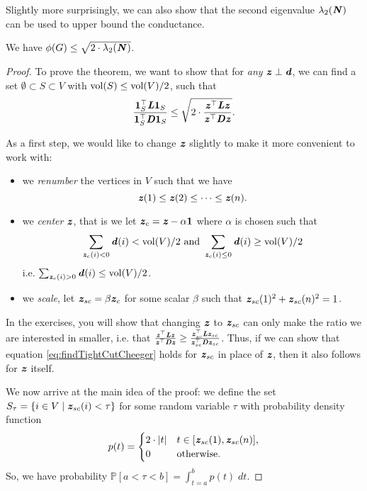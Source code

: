 Slightly more surprisingly, we can also show that the second eigenvalue $\lambda_2(\boldsymbol{\mathit{N}})$ can be used to upper bound the conductance.

\begin{theorem}\label{thm:cheegerInequUpperBound}
We have $\phi(G) \leq \sqrt{2 \cdot \lambda_2(\boldsymbol{\mathit{N}})}$.
\end{theorem}
\begin{proof}
To prove the theorem, we want to show that for \emph{any} $\boldsymbol{\mathit{z}} \perp
\boldsymbol{\mathit{d}}$, we can find a set $\emptyset \subset S \subset V$ with $\operatorname{vol}(S)
\leq \operatorname{vol}(V)/2$, such that 
\begin{equation}\label{eq:findTightCutCheeger}
\frac{\boldsymbol{1}_S^\top \boldsymbol{\mathit{L}} \boldsymbol{1}_S}{\boldsymbol{1}_S^\top \boldsymbol{\mathit{D}} \boldsymbol{1}_S}  \leq \sqrt{2 \cdot \frac{\boldsymbol{\mathit{z}}^\top \boldsymbol{\mathit{L}} \boldsymbol{\mathit{z}}}{\boldsymbol{\mathit{z}}^\top \boldsymbol{\mathit{D}} \boldsymbol{\mathit{z}}}}.    
\end{equation}

As a first step, we would like to change $\boldsymbol{\mathit{z}}$ slightly to make it more convenient to work with:
\begin{itemize}
    \item we \emph{renumber} the vertices in $V$ such that we have
    \[
    \boldsymbol{\mathit{z}}(1) \leq \boldsymbol{\mathit{z}}(2) \leq \dots \leq \boldsymbol{\mathit{z}}(n).
    \]
    \item we \emph{center} $\boldsymbol{\mathit{z}}$, that is we let $\boldsymbol{\mathit{z}}_c = \boldsymbol{\mathit{z}} - \alpha \boldsymbol{1}$ where $\alpha$ is chosen such that \begin{align*}
        \sum_{\boldsymbol{\mathit{z}}_c(i) < 0} \boldsymbol{\mathit{d}}(i) < \operatorname{vol}(V)/2 \text{ and }
        \sum_{\boldsymbol{\mathit{z}}_c(i) \leq 0} \boldsymbol{\mathit{d}}(i) \geq \operatorname{vol}(V)/2
    \end{align*}
    i.e. $\sum_{\boldsymbol{\mathit{z}}_c(i) > 0} \boldsymbol{\mathit{d}}(i) \leq \operatorname{vol}(V)/2$.
    \item we \emph{scale}, let $\boldsymbol{\mathit{z}}_{sc} = \beta \boldsymbol{\mathit{z}}_c$ for some scalar $\beta$ such that $\boldsymbol{\mathit{z}}_{sc}(1)^2 + \boldsymbol{\mathit{z}}_{sc}(n)^2 = 1$. 
\end{itemize}
In the exercises, you will show that changing $\boldsymbol{\mathit{z}}$ to $\boldsymbol{\mathit{z}}_{sc}$ can only make the ratio we are interested in smaller, i.e. that
$\frac{\boldsymbol{\mathit{z}}^\top \boldsymbol{\mathit{L}} \boldsymbol{\mathit{z}}}{\boldsymbol{\mathit{z}}^\top \boldsymbol{\mathit{D}} \boldsymbol{\mathit{z}}} \geq \frac{\boldsymbol{\mathit{z}}_{sc}^\top \boldsymbol{\mathit{L}} \boldsymbol{\mathit{z}}_{sc}}{\boldsymbol{\mathit{z}}_{sc}^\top \boldsymbol{\mathit{D}} \boldsymbol{\mathit{z}}_{sc}}$. Thus, if we can show that equation \ref{eq:findTightCutCheeger} holds for $\boldsymbol{\mathit{z}}_{sc}$ in place of $\boldsymbol{\mathit{z}}$, then it also follows for $\boldsymbol{\mathit{z}}$ itself.

We now arrive at the main idea of the proof: we define the set $S_{\tau} = \{ i \in V \;|\; \boldsymbol{\mathit{z}}_{sc}(i) < \tau\}$ for some random variable $\tau$ with probability density function
\begin{align}\label{eq:cheegerDefineDensityFun}
    p(t) = \begin{cases}
        2 \cdot |t| &t \in [\boldsymbol{\mathit{z}}_{sc}(1), \boldsymbol{\mathit{z}}_{sc}(n)],
        \\
        0 &\text{otherwise}.
        \end{cases}
\end{align}
So, we have probability $\mathbb{P}[a < \tau < b] = \int_{t=a}^b p(t)\; dt$.


\end{proof}
